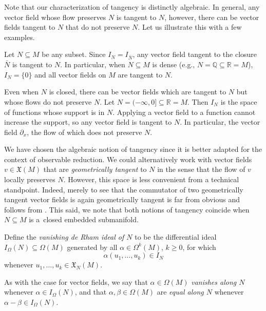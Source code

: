 \documentclass[pdftex]{sigma}
\numberwithin{equation}{section}
\newcommand{\X}{\mathfrak{X}}
\renewcommand{\subset}{\subseteq}
\begin{document}
Note that our characterization of tangency is distinctly algebraic. In general, any vector field whose flow preserves $N$ is tangent to $N$, however, there can be vector fields tangent to $N$ that do not preserve $N$. Let us illustrate this with a few examples.

\begin{Remark}
	Let $N\subset M$ be any subset. Since $I_N=I_{\bar N}$, any vector field tangent to the closure~$\bar N$ is tangent to $N$. In particular, when $N\subset M$ is dense (e.g., $N=\mathbb Q\subset  \mathbb R=M$), $I_N=\{0\}$ and all vector fields on $M$ are tangent to $N$.
\end{Remark}

\begin{Example}
	Even when $N$ is closed, there can be vector fields which are tangent to $N$ but whose flows do not preserve $N$. Let $N=(-\infty,0]\subset \mathbb R=M$. Then $I_N$ is the space of functions whose support is in $N$. Applying a vector field to a function cannot increase the support, so any vector field is tangent to $N$. In particular, the vector field $\partial_x$, the flow of which does not preserve $N$.
\end{Example}

\begin{Remark}
	We have chosen the algebraic notion of tangency since it is better adapted for the context of observable reduction. We could alternatively work with vector fields $v\in\X(M)$ that are \emph{geometrically tangent} to $N$ in the sense that the flow of $v$ locally preserves $N$. However, this space is less convenient from a technical standpoint. Indeed, merely to see that the commutator of two geometrically tangent vector fields is again geometrically tangent is far from obvious and follows from \cite{Sussmann73}. This said, we note that both notions of tangency coincide when $N\subset M$ is a~closed embedded submanifold.
\end{Remark}

\begin{Definition}\label{def:vanishing_de_Rham_ideal}
	Define the \emph{vanishing de Rham ideal of $N$} to be the differential ideal $I_\Omega(N)\subset\Omega(M)$ generated by all $\alpha\in\Omega^k(M)$, $k\geq 0$, for which
	\[
		\alpha(u_1,\dots,u_k) \in I_N
	\]
	whenever $u_1,\dots,u_k\in\X_N(M)$.
\end{Definition}

As with the case for vector fields, we say that $\alpha\in\Omega(M)$ \emph{vanishes along $N$} whenever ${\alpha\in I_\Omega(N)}$, and that $\alpha,\beta\in\Omega(M)$ are \emph{equal along $N$} whenever $\alpha-\beta\in I_\Omega(N)$.
\end{document}
